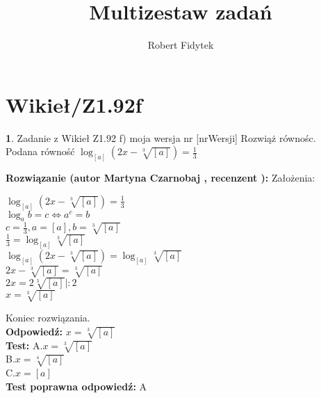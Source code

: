 \documentclass[12pt, a4paper]{article}
\title{Multizestaw zadań}
\author{Robert Fidytek}
\date{}
\theoremstyle{definition} %
\newtheorem{zad}{}
\newcommand{\kategoria}[1]{\section{#1}} %
\newcommand{\zadStart}[1]{\begin{zad}#1\newline} %
\newcommand{\zadStop}{\end{zad}}   %
\newcommand{\rozwStart}[2]{\noindent \textbf{Rozwiązanie (autor #1 , recenzent #2): }\newline} %
\newcommand{\rozwStop}{\newline}                                            %
\newcommand{\odpStart}{\noindent \textbf{Odpowiedź:}\newline}    %
\newcommand{\odpStop}{\newline}                                             %
\newcommand{\testStart}{\noindent \textbf{Test:}\newline} %
\newcommand{\testStop}{\newline} %
\newcommand{\kluczStart}{\noindent \textbf{Test poprawna odpowiedź:}\newline} %
\newcommand{\kluczStop}{\newline} %
\begin{document}
\maketitle


\kategoria{Wikieł/Z1.92f}
\zadStart{Zadanie z Wikieł Z1.92 f) moja wersja nr [nrWersji]}
Rozwiąż równośc.\\
Podana równość $ \log_{[a]} (2x - \sqrt[3]{[a]})  = \frac{1}{3}$\\
\zadStop
\rozwStart{Martyna Czarnobaj}{}
Założenia:\\
\begin{center}
	$ \log_{[a]} (2x - \sqrt[3]{[a]})  = \frac{1}{3}$\\
	$ \log_{a} b = c \Leftrightarrow a^{c} = b $\\
	$ c = \frac{1}{3}, a = [a], b = \sqrt[3]{[a]}  $\\
	$ \frac{1}{3} = \log_{[a]} \sqrt[3]{[a]} $\\
	$ \log_{[a]} (2x - \sqrt[3]{[a]})  = \log_{[a]} \sqrt[3]{[a]} $\\
	$ 2x - \sqrt[3]{[a]} = \sqrt[3]{[a]} $\\
	$ 2x = 2\sqrt[3]{[a]} |:2 $\\
	$ x = \sqrt[3]{[a]} $\\
\end{center}

Koniec rozwiązania.\\
\rozwStop
\odpStart
$ x = \sqrt[3]{[a]} $\\
\odpStop
\testStart
A.$ x = \sqrt[3]{[a]} $\\
B.$ x = \sqrt[4]{[a]} $\\
C.$ x = [a] $\\
\testStop
\kluczStart
A
\kluczStop
\end{document}
